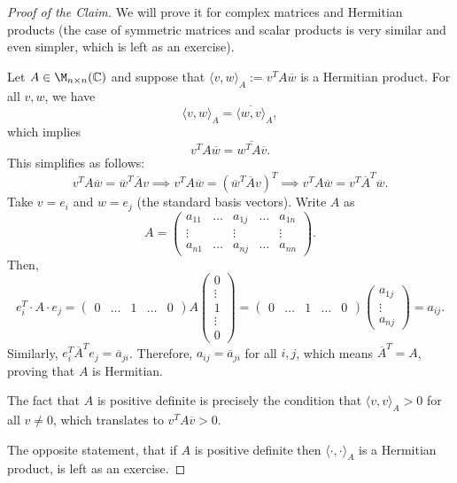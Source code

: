 \begin{proof}[Proof of the Claim]
    We will prove it for complex matrices and Hermitian products (the case of symmetric matrices and scalar products is very similar and even simpler, which is left as an exercise). 
    
    Let $A \in \M_{n \times n}(\mathbb{C})$ and suppose that $\langle v, w \rangle_A := v^T A \overline{w}$ is a Hermitian product. For all $v, w$, we have 
    \begin{equation}\langle v, w \rangle_A = \overline{\langle w, v \rangle}_A,\end{equation} 
    which implies
    \begin{equation*}
        v^T A \overline{w} = \overline{w^T A \overline{v}}.
    \end{equation*}
    This simplifies as follows:
    \begin{equation*}
        v^T A \overline{w} = \overline{w}^T \overline{A} v \implies v^T A \overline{w} = (\overline{w}^T \overline{A} v)^T \implies v^T A \overline{w} = v^T \overline{A}^T \overline{w}.
    \end{equation*}
    Take $v = e_i$ and $w = e_j$ (the standard basis vectors). Write $A$ as
    \begin{equation*}
        A = \begin{pmatrix} a_{11} & \dots & a_{1j} & \dots & a_{1n} \\ \vdots & & \vdots & & \vdots \\ a_{n1} & \dots & a_{nj} & \dots & a_{nn} \end{pmatrix}.
    \end{equation*}
    Then,
    \begin{equation*}
        e_i^T \cdot A \cdot e_j = \begin{pmatrix} 0 & \dots & 1 & \dots & 0 \end{pmatrix} A \begin{pmatrix} 0 \\ \vdots \\ 1 \\ \vdots \\ 0 \end{pmatrix} = \begin{pmatrix} 0 & \dots & 1 & \dots & 0 \end{pmatrix} \begin{pmatrix} a_{1j} \\ \vdots \\ a_{nj} \end{pmatrix} = a_{ij}.
    \end{equation*}
    Similarly, $e_i^T \overline{A}^T e_j = \overline{a}_{ji}$. Therefore, $a_{ij} = \overline{a}_{ji}$ for all $i, j$, which means $\overline{A}^T = A$, proving that $A$ is Hermitian. 
    
    The fact that $A$ is positive definite is precisely the condition that $\langle v, v \rangle_A > 0$ for all $v \neq 0$, which translates to $v^T A \overline{v} > 0$.
    
    The opposite statement, that if $A$ is positive definite then $\langle \cdot, \cdot \rangle_A$ is a Hermitian product, is left as an exercise.
\end{proof}

